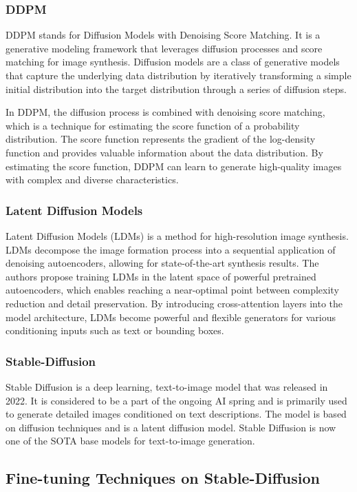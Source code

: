 \documentclass[conference]{IEEEtran}
\begin{document}
\subsubsection{DDPM}
DDPM\cite{ddpm} stands for Diffusion Models with Denoising Score Matching. It is a generative modeling framework that leverages diffusion processes and score matching for image synthesis. Diffusion models are a class of generative models that capture the underlying data distribution by iteratively transforming a simple initial distribution into the target distribution through a series of diffusion steps.

In DDPM, the diffusion process is combined with denoising score matching, which is a technique for estimating the score function of a probability distribution. The score function represents the gradient of the log-density function and provides valuable information about the data distribution. By estimating the score function, DDPM can learn to generate high-quality images with complex and diverse characteristics.

\subsubsection{Latent Diffusion Models} 
Latent Diffusion Models (LDMs)\cite{ldm} is a method for high-resolution image synthesis. LDMs decompose the image formation process into a sequential application of denoising autoencoders, allowing for state-of-the-art synthesis results. The authors propose training LDMs in the latent space of powerful pretrained autoencoders, which enables reaching a near-optimal point between complexity reduction and detail preservation. By introducing cross-attention layers into the model architecture, LDMs become powerful and flexible generators for various conditioning inputs such as text or bounding boxes.

\subsubsection{Stable-Diffusion}
Stable Diffusion is a deep learning, text-to-image model that was released in 2022. It is considered to be a part of the ongoing AI spring and is primarily used to generate detailed images conditioned on text descriptions. The model is based on diffusion techniques and is a latent diffusion model. Stable Diffusion is now one of the SOTA base models for text-to-image generation.

\subsection{Fine-tuning Techniques on Stable-Diffusion}
\end{document}
